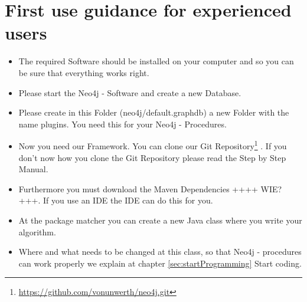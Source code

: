 \section {First use guidance for experienced users} \label{sec:beforeFirstUse}
\begin{itemize}
	\item The required Software should be installed on your computer and so you can be sure that everything works right.
	\item Please start the Neo4j - Software and create a new Database. 
	\item Please create in this Folder (neo4j/default.graphdb) a new Folder with the name \glqq plugins\grqq{}. You need this for your \glqq  Neo4j - Procedures\grqq{}.
	\item Now you need our Framework. You can clone our \glqq Git Repository\footnote{\url{https://github.com/vonunwerth/neo4j.git}} \grqq{}. If you don't now how you clone the \glqq Git Repository\grqq{} please read the Step by Step Manual.
	\item Furthermore you must download the \glqq Maven Dependencies\grqq{} ++++ WIE? +++. If you use an IDE the IDE can do this for you.
	\item At the package \glqq matcher\grqq{} you can create a new Java class where you write your algorithm.
	\item Where and what needs to be changed at this class, so that \glqq Neo4j - procedures\grqq{} can work properly we explain at chapter \ref{sec:startProgramming} \glqq Start\grqq{} coding. 
\end{itemize}

